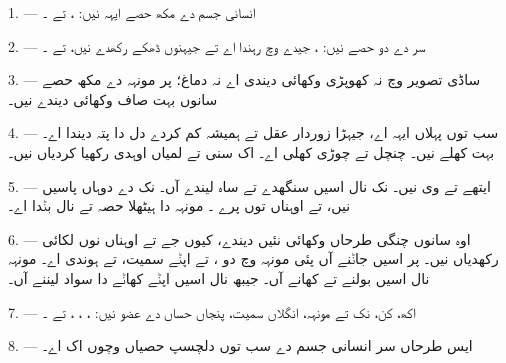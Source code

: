 
\VUsaut{4.0mm}
\VUsaut{2.0mm}

\VUsaut{2.4mm}
\VUsaut{3.0mm}

1. --- انسانی جسم دے مکھ حصے ایہہ نیں: ،  تے
۔

\VUsaut{3.0mm}

2. --- سر دے دو حصے نیں: ، جیدے وچ  رہندا اے تے
جیہنوں  ڈھکے رکھدے نیں، تے ۔

3. --- ساڈی تصویر وچ نہ کھوپڑی وکھائی دیندی اے نہ دماغ؛ پر مونہہ دے مکھ حصے
سانوں بہت صاف وکھائی دیندے نیں۔

4. --- سب توں پہلاں ایہہ  اے، جیہڑا زوردار عقل تے ہمیشہ کم کردے
دل دا پتہ دیندا اے۔  بہت کھلے نیں۔  چنچل تے چوڑی کھلی
اے۔ اک سنی  تے لمیاں  اوہدی رکھیا کردیاں نیں۔

5. --- ایتھے  تے  وی نیں۔ نک نال اسیں سنگھدے تے ساہ
لیندے آں۔ نک دے دوہاں پاسیں  نیں، تے اوہناں توں پرے ۔
مونہہ دا ہیٹھلا حصہ  تے  نال بݨدا اے۔

6. --- اوہ سانوں چنگی طرحاں وکھائی نئیں دیندے، کیوں جے  تے
 اوہناں نوں لکائی رکھدیاں نیں۔ پر اسیں جاݨنے آں پئی مونہہ وچ دو
،  تے  اپݨے
 سمیت، تے  ہوندی اے۔ مونہہ نال اسیں بولنے تے کھانے
آں۔ جیبھ نال اسیں اپݨے کھاݨے دا سواد لیننے آں۔

7. --- اکھ، کن، نک تے مونہہ، انگلاں سمیت، پنجاں حساں دے عضو نیں:
، ، ،  تے ۔

8. --- ایس طرحاں سر انسانی جسم دے سب توں دلچسپ حصیاں وچوں اک اے۔

